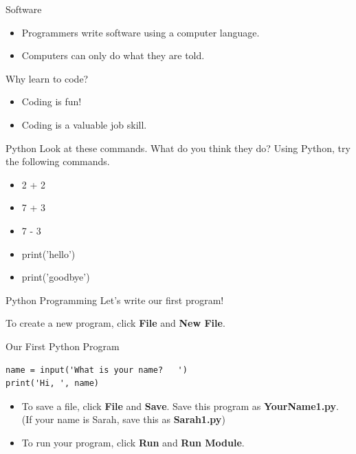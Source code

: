 \documentclass{beamer}
\begin{document}
\begin{frame}{Software}
\begin{itemize}
\item Programmers write software using a computer language.
\item Computers can only do what they are told.
\end{itemize}
\end{frame}

\begin{frame}{Why learn to code?}
\begin{itemize}
\item Coding is fun!
\item Coding is a valuable job skill.
\end{itemize}
\end{frame}

\begin{frame}{Python}
Look at these commands. What do you think they do? Using Python, try the following commands.
\begin{itemize}
\item 2 + 2
\item 7 + 3
\item 7 - 3
\item print('hello')
\item print('goodbye')
\end{itemize}
\end{frame}

\begin{frame}{Python Programming}
Let's write our first program!

To create a new program, click \textbf{File} and \textbf{New File}.
\end{frame}

\begin{frame}[fragile]{Our First Python Program}

\begin{verbatim}
name = input('What is your name?   ')
print('Hi, ', name)
\end{verbatim}

\begin{itemize}
\item To save a file, click \textbf{File} and \textbf{Save}. Save this program as \textbf{YourName1.py}. (If your name is Sarah, save this as \textbf{Sarah1.py})
\item To run your program, click \textbf{Run} and \textbf{Run Module}.
\end{itemize}
\end{frame}
\end{document}
